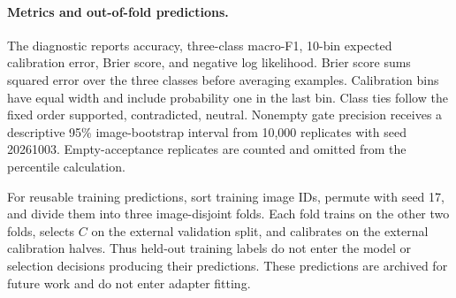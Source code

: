 \paragraph{Metrics and out-of-fold predictions.}
The diagnostic reports accuracy, three-class macro-F1, 10-bin expected calibration error, Brier score, and negative log likelihood. Brier score sums squared error over the three classes before averaging examples. Calibration bins have equal width and include probability one in the last bin. Class ties follow the fixed order supported, contradicted, neutral. Nonempty gate precision receives a descriptive 95\% image-bootstrap interval from 10,000 replicates with seed 20261003. Empty-acceptance replicates are counted and omitted from the percentile calculation.

For reusable training predictions, sort training image IDs, permute with seed 17, and divide them into three image-disjoint folds. Each fold trains on the other two folds, selects $C$ on the external validation split, and calibrates on the external calibration halves. Thus held-out training labels do not enter the model or selection decisions producing their predictions. These predictions are archived for future work and do not enter adapter fitting.


